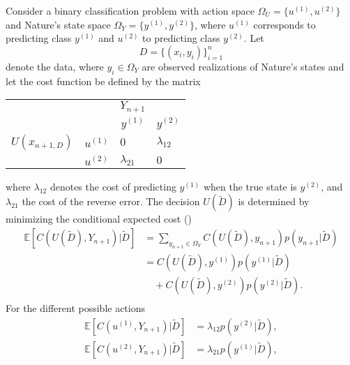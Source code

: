\begin{example}
	Consider a binary classification problem with action space $\Omega_U = \{u^{(1)},u^{(2)}\}$ and Nature's state space $\Omega_Y = \{y^{(1)}, y^{(2)}\}$, where $u^{(1)}$ corresponds to predicting class $y^{(1)}$ and $u^{(2)}$ to predicting class $y^{(2)}$. Let
	\begin{equation}
		D = \{(x_i,y_i)\}_{i=1}^n
	\end{equation}
	denote the data, where $y_i \in \Omega_Y$ are observed realizations of Nature's states and let the cost function be defined by the matrix
	\begin{center}
		\begin{tabular}{ c  c  c  c }
			&& $Y_{n+1}$& \\
			&& $y^{(1)}$ & $y^{(2)}$  \\
			\cline{3-4}
			$U(x_{n+1,D})$ & $u^{(1)}$& \multicolumn{1}{|l}{$0$} &\multicolumn{1}{l|}{$\lambda_{12}$}  \\
			& $u^{(2)}$& \multicolumn{1}{|l}{$\lambda_{21}$} & \multicolumn{1}{l|}{$0$} \\
			\cline{3-4}
		\end{tabular}
	\end{center}
	where $\lambda_{12}$ denotes the cost of predicting $y^{(1)}$ when the true state is $y^{(2)}$, and $\lambda_{21}$ the cost of the reverse error.  The decision $U(\tilde{D})$ is determined by minimizing the conditional expected cost ()
	\begin{equation}
		\begin{split}
			\mathbb{E}[C(U(\tilde{D}), Y_{n+1})|\tilde{D}] & = \sum_{y_{n+1}\in \Omega_Y}C(U(\tilde{D}),y_{n+1})p(y_{n+1}|\tilde{D})\\
			& = C(U(\tilde{D}),y^{(1)})p(y^{(1)}|\tilde{D})\\
			& \quad+C(U(\tilde{D}),y^{(2)})p(y^{(2)}|\tilde{D}).\\
		\end{split}
	\end{equation}
	For the different possible actions
	\begin{equation}
		\begin{split}
			\mathbb{E}[C(u^{(1)}, Y_{n+1})|\tilde{D}] &= \lambda_{12}p(y^{(2)}|\tilde{D}),\\
			\mathbb{E}[C(u^{(2)}, Y_{n+1})|\tilde{D}] &= \lambda_{21}p(y^{(1)}|\tilde{D}),\\
		\end{split}
	\end{equation}

\end{example}
